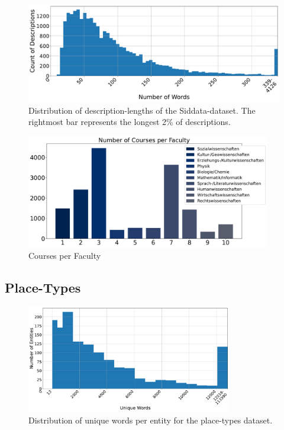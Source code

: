 \begin{figure}[H]
	\centering
	\includegraphics[width=\textwidth]{graphics/dataset_new/words_per_desc.pdf}
	\caption{Distribution of description-lengths of the Siddata-dataset. The rightmost bar represents the longest 2\% of descriptions.}
	\label{fig:sid_wordsperdesc}
\end{figure}

\begin{figure}[H]
	\centering
	\includegraphics[width=0.95\textwidth]{graphics/dataset_new/courses_per_faculty.pdf}
	\caption{Courses per Faculty}
	\label{fig:courses_per_faculty}
\end{figure}





\subsection{Place-Types}
\label{sec:dataset_placetypes}


\begin{figure}[H]
	\centering
	\includegraphics[width=0.8\textwidth]{graphics/figures/placetypes_dist_unique.pdf}
	\caption{Distribution of unique words per entity for the place-types dataset.}
	\label{fig:placetypes_dist_unique}
\end{figure}




